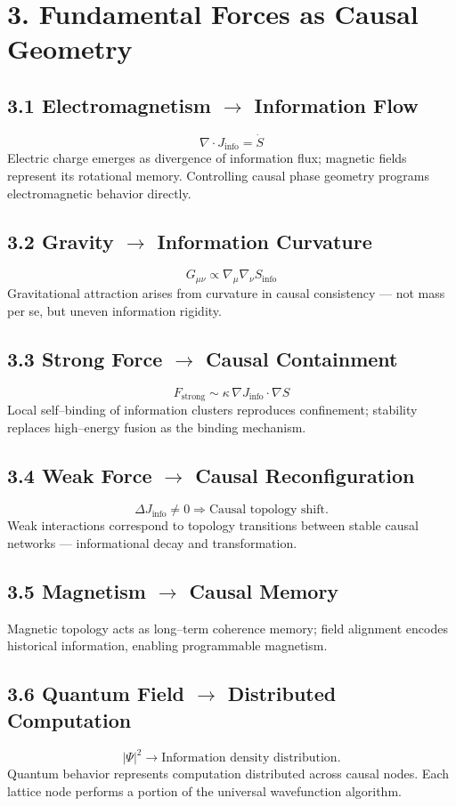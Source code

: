 \documentclass[11pt,a4paper]{article}
\begin{document}
\section{3. Fundamental Forces as Causal Geometry}
\subsection*{3.1 Electromagnetism $\rightarrow$ Information Flow}
\[
\nabla \cdot J_{\text{info}} = \dot{S}
\]
Electric charge emerges as divergence of information flux; magnetic fields represent its rotational memory.  
Controlling causal phase geometry programs electromagnetic behavior directly.

\subsection*{3.2 Gravity $\rightarrow$ Information Curvature}
\[
G_{\mu\nu} \propto \nabla_\mu \nabla_\nu S_{\text{info}}
\]
Gravitational attraction arises from curvature in causal consistency --- not mass per se, but uneven information rigidity.

\subsection*{3.3 Strong Force $\rightarrow$ Causal Containment}
\[
F_{\text{strong}} \sim \kappa \, \nabla J_{\text{info}} \cdot \nabla S
\]
Local self–binding of information clusters reproduces confinement; stability replaces high–energy fusion as the binding mechanism.

\subsection*{3.4 Weak Force $\rightarrow$ Causal Reconfiguration}
\[
\Delta J_{\text{info}} \neq 0 \Rightarrow \text{Causal topology shift.}
\]
Weak interactions correspond to topology transitions between stable causal networks --- informational decay and transformation.

\subsection*{3.5 Magnetism $\rightarrow$ Causal Memory}
Magnetic topology acts as long–term coherence memory; field alignment encodes historical information, enabling programmable magnetism.

\subsection*{3.6 Quantum Field $\rightarrow$ Distributed Computation}
\[
|\Psi|^2 \rightarrow \text{Information density distribution.}
\]
Quantum behavior represents computation distributed across causal nodes.  
Each lattice node performs a portion of the universal wavefunction algorithm.
\end{document}
